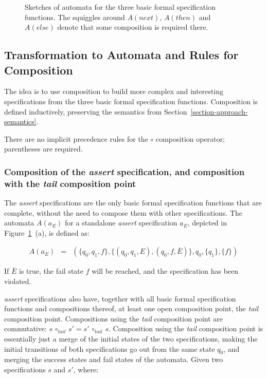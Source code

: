 \documentclass[a4paper,11pt]{kth-mag}
\begin{document}
\begin{figure}[h!]
  \caption{Sketches of automata for the three basic formal specification
    functions. The squiggles around $A(next)$, $A(then)$ and $A(else)$ denote
    that some composition is required there.}
	\label{figure-basic-formal-specification-automata}
\end{figure}


\subsection{Transformation to Automata and Rules for Composition}
\label{section-approach-composition}
\lstset{language=Python,numbers=none}

The idea is to use composition to build more complex and interesting
specifications from the three basic formal specification functions. Composition
is defined inductively, preserving the semantics from
Section~\ref{section-approach-semantics}.

There are no implicit precedence rules for the $\circ$ composition operator;
parentheses are required.


\subsubsection{Composition of the \textit{assert} specification, and
composition with the \textit{tail} composition point}

The \textit{assert} specifications are the only basic formal specification
functions that are complete, without the need to compose them with other
specifications. The automata $A(a_E)$ for a standalone \textit{assert}
specification $a_E$, depicted in
Figure~\ref{figure-basic-formal-specification-automata}~(a), is defined as:

\medskip
\[
  \begin{array}{rcl}
    A(a_E) & = & (\{q_0, q_1, f\}, \{(q_0, q_1, E), (q_0, f, \bar{E})\}, q_0, \{q_1\}, \{f\})
  \end{array}
\]
\medskip

If $\bar{E}$ is true, the fail state $f$ will be reached, and the specification
has been violated.

\textit{assert} specifications also have, together with all basic formal
specification functions and compositions thereof, at least one open composition
point, the \textit{tail} composition point. Compositions using the
\textit{tail} composition point are commutative: $s \, \circ_{tail} \, s' = s'
\, \circ_{tail} \, s$. Composition using the \textit{tail} composition point is
essentially just a merge of the initial states of the two specifications,
making the initial transitions of both specifications go out from the same
state $q_0$, and merging the success states and fail states of the automata. Given two
specifications $s$ and $s'$, where:
\end{document}
